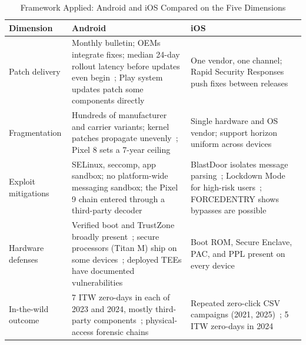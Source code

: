 \documentclass[conference,a4paper]{IEEEtran}
\begin{document}
\begin{table}[htbp]
\caption{Framework Applied: Android and iOS Compared on the Five Dimensions}
\begin{center}
\begin{tabular}{@{}p{2.1cm}p{6.6cm}p{6.6cm}@{}}
\toprule
\textbf{Dimension} & \textbf{Android} & \textbf{iOS} \\
\midrule
Patch delivery & Monthly bulletin; OEMs integrate fixes; median 24-day rollout latency before updates even begin~\cite{jones2020deploying}; Play system updates patch some components directly~\cite{mainline2019} & One vendor, one channel; Rapid Security Responses push fixes between releases~\cite{applersr2026} \\
\addlinespace
Fragmentation & Hundreds of manufacturer and carrier variants; kernel patches propagate unevenly~\cite{zhang2021kernel}; Pixel 8 sets a 7-year ceiling~\cite{pixel2023support} & Single hardware and OS vendor; support horizon uniform across devices~\cite{applesecurity2026} \\
\addlinespace
Exploit mitigations & SELinux, seccomp, app sandbox; no platform-wide messaging sandbox; the Pixel 9 chain entered through a third-party decoder~\cite{silvanovich2026pixel} & BlastDoor isolates message parsing~\cite{silvanovich2021imessage}; Lockdown Mode for high-risk users~\cite{lockdown2022}; FORCEDENTRY shows bypasses are possible~\cite{marczak2021forcedentry} \\
\addlinespace
Hardware defenses & Verified boot and TrustZone broadly present~\cite{aospverifiedboot2026, pinto2019demystifying}; secure processors (Titan M) ship on some devices~\cite{titanm2018}; deployed TEEs have documented vulnerabilities~\cite{cerdeira2020sok} & Boot ROM, Secure Enclave, PAC, and PPL present on every device~\cite{applesecurity2026} \\
\addlinespace
In-the-wild outcome & 7 ITW zero-days in each of 2023 and 2024, mostly third-party components~\cite{charrier2025zeroday}; physical-access forensic chains~\cite{charrier2025zeroday} & Repeated zero-click CSV campaigns (2021, 2025)~\cite{marczak2021forcedentry, marczak2025graphite}; 5 ITW zero-days in 2024~\cite{charrier2025zeroday} \\
\bottomrule
\end{tabular}
\label{tab:applied}
\end{center}
\end{table}
\end{document}
